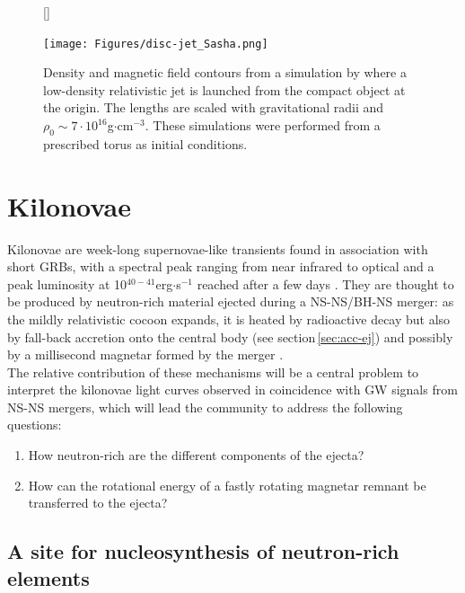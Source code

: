 \documentclass[11pt,onecolumn]{article}
\makeatletter
\newcommand{\gw}{GW\xspace}
\newcommand{\grbs}{GRBs\xspace}
\newcommand*{\ns}{NS\@\xspace}
\newcommand*{\bh}{BH\@\xspace}
\makeatother
\begin{document}
\begin{figure}[!h]
\vspace*{-0.2cm}
[\FBwidth]
{\caption{Density and magnetic field contours from a simulation by \citet{Kathirgamaraju2019} where a low-density relativistic jet is launched from the compact object at the origin. The lengths are scaled with gravitational radii and $\rho_0\sim7\cdot 10^{16}$g$\cdot$cm$^{-3}$. These simulations were performed from a prescribed torus as initial conditions.}\label{fig:disc-jet_Sasha}}
{\texttt{[image: Figures/disc-jet\_Sasha.png]}}
\end{figure}

\vspace*{-0.4cm}

\section{Kilonovae}

Kilonovae are week-long supernovae-like transients found in association with short \grbs, with a spectral peak ranging from near infrared to optical and a peak luminosity at 10$^{40-41}$erg$\cdot$s$^{-1}$ reached after a few days \citep{Tanaka2016,Metzger2017}. They are thought to be produced by neutron-rich material ejected during a \ns-\ns/\bh-\ns merger: as the mildly relativistic cocoon expands, it is heated by radioactive decay \citep{Li1998} but also by fall-back accretion onto the central body (see section\,\ref{sec:acc-ej}) and possibly by a millisecond magnetar formed by the merger \citep{Yu2013}.\\

The relative contribution of these mechanisms will be a central problem to interpret the kilonovae light curves observed in coincidence with \gw signals from \ns-\ns mergers, which will lead the community to address the following questions:

\begin{enumerate}[itemsep=0mm]
\item How neutron-rich are the different components of the ejecta?
\item How can the rotational energy of a fastly rotating magnetar remnant be transferred to the ejecta?
\end{enumerate}

\subsection{A site for nucleosynthesis of neutron-rich elements}
\label{sec:nucleo}
\end{document}
